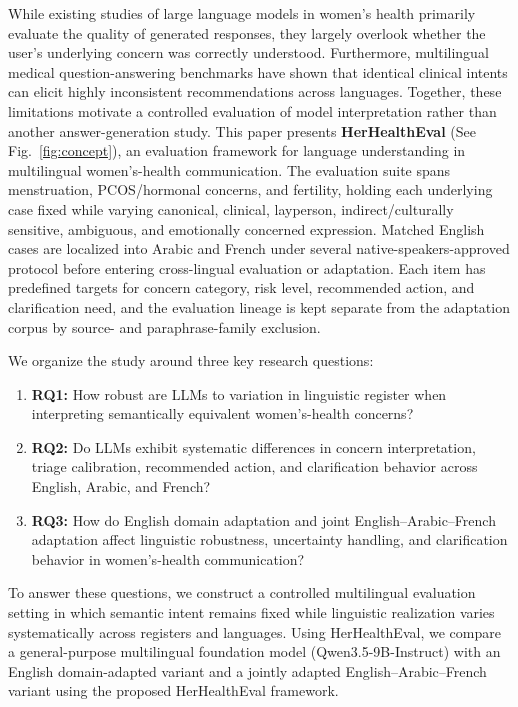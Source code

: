 While existing studies of large language models in women's health primarily evaluate the quality of generated responses, they largely overlook whether the user's underlying concern was correctly understood. Furthermore, multilingual medical question-answering benchmarks have shown that identical clinical intents can elicit highly inconsistent recommendations across languages. Together, these limitations motivate a controlled evaluation of model interpretation rather than another answer-generation study. This paper presents \textbf{HerHealthEval} (See Fig.~\ref{fig:concept}), an evaluation framework for  language understanding in multilingual women's-health communication.
The evaluation suite spans menstruation, PCOS/hormonal concerns, and fertility, holding each underlying case fixed while varying canonical, clinical, layperson, indirect/culturally sensitive, ambiguous, and emotionally concerned expression.
Matched English cases are localized into Arabic and French under several native-speakers-approved protocol before entering cross-lingual evaluation or adaptation.
Each item has predefined targets for concern category, risk level, recommended action, and clarification need, and the evaluation lineage is kept separate from the adaptation corpus by source- and paraphrase-family exclusion.



We organize the study around three key research questions:
\begin{enumerate}
    \item \textbf{RQ1:}
    How robust are LLMs to variation in linguistic register when interpreting
    semantically equivalent women's-health concerns?
    \item \textbf{RQ2:}
    Do LLMs exhibit systematic differences in concern interpretation, triage
    calibration, recommended action, and clarification behavior across
    English, Arabic, and French?
    \item \textbf{RQ3:}
    How do English domain adaptation and joint English--Arabic--French
    adaptation affect linguistic robustness, uncertainty handling, and clarification behavior in women's-health communication?
\end{enumerate}


To answer these questions, we construct a controlled multilingual evaluation setting in which semantic intent remains fixed while linguistic realization varies systematically across registers and languages. Using HerHealthEval, we compare a general-purpose multilingual foundation model (Qwen3.5-9B-Instruct) with an English domain-adapted variant and a jointly adapted English--Arabic--French variant using the proposed HerHealthEval framework.


